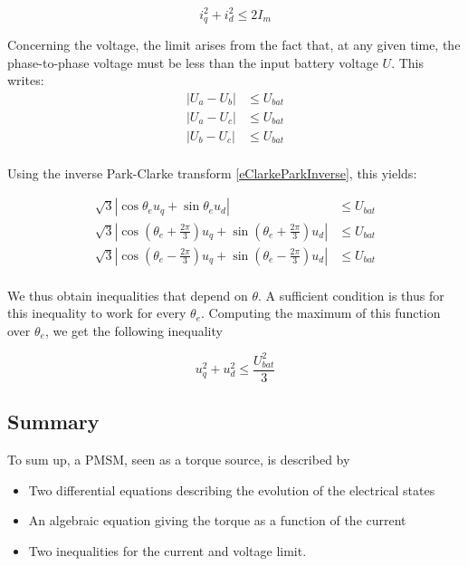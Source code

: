 \documentclass[a4paper,10pt]{article}
\begin{document}
\begin{equation}
	i_q^2 + i_d^2 \leq 2 I_m
\end{equation}

Concerning the voltage, the limit arises from the fact that, at any given time, the phase-to-phase voltage
must be less than the input battery voltage $U$. This writes:
\begin{equation}
	\begin{aligned}
	|U_a - U_b| &\leq U_{bat} \\
	|U_a - U_c| &\leq U_{bat} \\
	|U_b - U_c| &\leq U_{bat} \\
	\end{aligned}
\end{equation}

Using the inverse Park-Clarke transform \eqref{eClarkeParkInverse}, this yields:

\begin{equation}
	\begin{aligned}
		\sqrt{3} |\cos \theta_e u_q + \sin \theta_e u_d| &\leq U_{bat} \\
		\sqrt{3} |\cos (\theta_e + \frac{2 \pi}{3}) u_q + \sin (\theta_e + \frac{2 \pi}{3}) u_d| &\leq U_{bat} \\
		\sqrt{3} |\cos (\theta_e - \frac{2 \pi}{3}) u_q + \sin (\theta_e - \frac{2 \pi}{3}) u_d| &\leq U_{bat} \\
	\end{aligned}
\end{equation}

We thus obtain inequalities that depend on $\theta$. A sufficient condition is thus for this inequality to work for every $\theta_e$. Computing the maximum of this function over $\theta_e$, we get the following inequality

\begin{equation}
	u_q^2 + u_d^2 \leq \frac{U_{bat}^2}{3}
\end{equation}

\subsection{Summary}

To sum up, a PMSM, seen as a torque source, is described by 

\begin{itemize}
	\item Two differential equations describing the evolution of the electrical states
	\item An algebraic equation giving the torque as a function of the current
	\item Two inequalities for the current and voltage limit.
\end{itemize}
\end{document}

